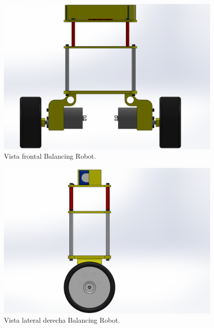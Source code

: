 \begin{center}
	\begin{figure}[H]
		\center
		\includegraphics[trim = 1cm 0mm 2.7cm 0mm,clip, angle=0, scale = 0.6]{imagenes/Balancing_Robot/EnsanBalanceFront.PDF}
		\caption{Vista frontal Balancing Robot.}
		\label{fig:EnsanBalanceFront}
	\end{figure}
\end{center}

\begin{center}
	\begin{figure}[H]
		\center
		\includegraphics[trim = 5cm 0mm 10cm 0mm,clip, angle=0, scale = 1]{imagenes/Balancing_Robot/EnsanBalanceLateral.PDF}
		\caption{Vista lateral derecha Balancing Robot.}
		\label{fig:EnsanBalanceLateral}
	\end{figure}
\end{center}

